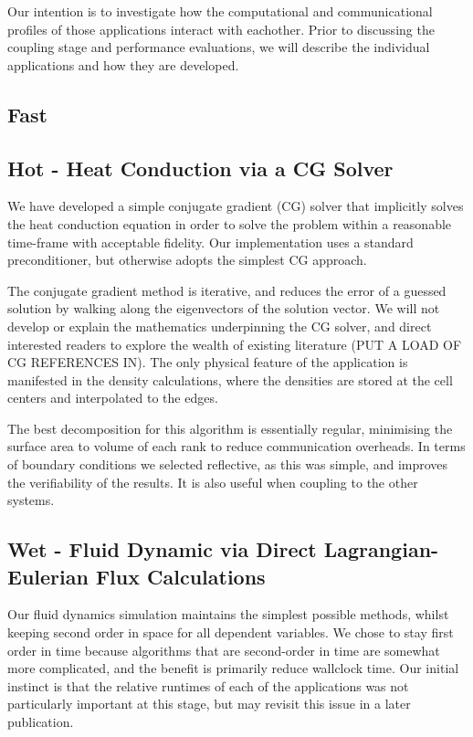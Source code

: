 \documentclass[runningheads,a4paper]{llncs}
\begin{document}
Our intention is to investigate how the computational and communicational profiles of those applications interact with eachother. Prior to discussing the coupling stage and performance evaluations, we will describe the individual applications and how they are developed.



\subsection{Fast}


\subsection{Hot - Heat Conduction via a CG Solver}

We have developed a simple conjugate gradient (CG) solver that implicitly solves the heat conduction equation in order to solve the problem within a reasonable time-frame with acceptable fidelity. Our implementation uses a standard preconditioner, but otherwise adopts the simplest CG approach. 

The conjugate gradient method is iterative, and reduces the error of a guessed solution by walking along the eigenvectors of the solution vector. We will not develop or explain the mathematics underpinning the CG solver, and direct interested readers to explore the wealth of existing literature \cite{} (PUT A LOAD OF CG REFERENCES IN). The only physical feature of the application is manifested in the density calculations, where the densities are stored at the cell centers and interpolated to the edges.

The best decomposition for this algorithm is essentially regular, minimising the surface area to volume of each rank to reduce communication overheads. In terms of boundary conditions we selected reflective, as this was simple, and improves the verifiability of the results. It is also useful when coupling to the other systems.

\subsection{Wet - Fluid Dynamic via Direct Lagrangian-Eulerian Flux Calculations}

Our fluid dynamics simulation maintains the simplest possible methods, whilst keeping second order in space for all dependent variables. We chose to stay first order in time because algorithms that are second-order in time are somewhat more complicated, and the benefit is primarily reduce wallclock time. Our initial instinct is that the relative runtimes of each of the applications was not particularly important at this stage, but may revisit this issue in a later publication.
\end{document}
